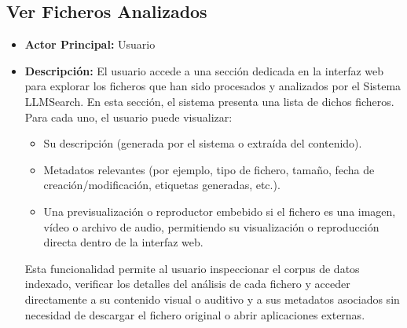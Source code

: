 \subsection{Ver Ficheros Analizados}
\begin{itemize}
\item \textbf{Actor Principal:} Usuario
\item \textbf{Descripción:} El usuario accede a una sección dedicada en la interfaz web para explorar los ficheros que han sido procesados y analizados por el Sistema LLMSearch. En esta sección, el sistema presenta una lista de dichos ficheros. Para cada uno, el usuario puede visualizar:
\begin{itemize}
\item Su descripción (generada por el sistema o extraída del contenido).
\item Metadatos relevantes (por ejemplo, tipo de fichero, tamaño, fecha de creación/modificación, etiquetas generadas, etc.).
\item Una previsualización o reproductor embebido si el fichero es una imagen, vídeo o archivo de audio, permitiendo su visualización o reproducción directa dentro de la interfaz web.
\end{itemize}
Esta funcionalidad permite al usuario inspeccionar el corpus de datos indexado, verificar los detalles del análisis de cada fichero y acceder directamente a su contenido visual o auditivo y a sus metadatos asociados sin necesidad de descargar el fichero original o abrir aplicaciones externas.
\end{itemize}

